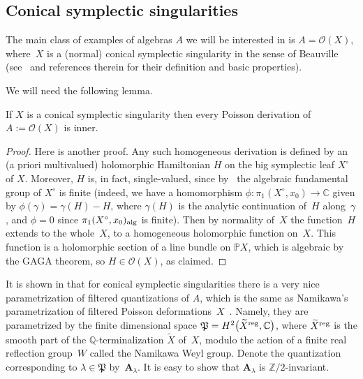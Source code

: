 \subsection{Conical symplectic singularities}

The main class of examples of algebras $A$ we will be interested in is $A={\mathcal O}(X)$, where~$X$ is a (normal) conical symplectic singularity in the sense of Beauville (see~\cite{Ka, L2} and references therein for their definition and basic properties).

We will need the following lemma.

\begin{Lemma}[{\cite[Proposition~2.5]{L2}}]\label{inn} If $X$ is a conical symplectic singularity then every Poisson derivation of $A:=\mathcal{O}(X)$ is inner.
\end{Lemma}

\begin{proof} Here is another proof. Any such homogeneous derivation is defined by an (a priori multivalued) holomorphic Hamiltonian $H$ on the big symplectic leaf $X^\circ$ of $X$. Moreover, $H$ is, in fact, single-valued, since by~\cite{Na1} the algebraic fundamental group of $X^\circ$ is finite (indeed, we have a homomorphism $\phi\colon \pi_1(X^\circ,x_0)\to {\mathbb C}$ given by $\phi(\gamma)=\gamma(H)-H$, where $\gamma(H)$ is the analytic continuation of~$H$ along~$\gamma$, and $\phi=0$ since $\pi_1(X^\circ,x_0)_{\rm alg}$ is finite). Then by normality of~$X$ the function~$H$ extends to the whole~$X$, to a homogeneous holomorphic function on~$X$. This function is a holomorphic section of a line bundle on ${\mathbb P}X$, which is algebraic by the GAGA theorem, so $H\in \mathcal{O}(X)$, as claimed.
\end{proof}

It is shown in \cite{L2} that for conical symplectic singularities there is a very nice parametrization of filtered quantizations of $A$, which is the same as Namikawa's parametrization of filtered Poisson deformations~$X$~\cite{Na3}. Namely, they are parametrized by the finite dimensional space $\mathfrak{P}=H^2\big(\widetilde X^{\rm reg},{\mathbb C}\big)$, where $\widetilde X^{\rm reg}$ is the smooth part of the ${\mathbb Q}$-terminalization $\widetilde X$ of~$X$, modulo the action of a finite real reflection group~$W$ called the Namikawa Weyl group. Denote the quantization corresponding to $\lambda\in \mathfrak{P}$ by~${\mathbf A}_\lambda$. It is easy to show that ${\mathbf A}_\lambda$ is ${\mathbb Z}/2$-invariant.

